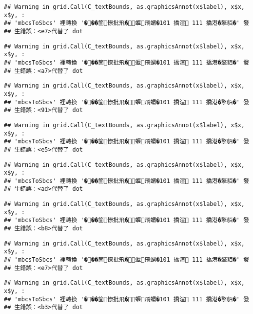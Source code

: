 \documentclass[
]{article}
\begin{document}
\begin{verbatim}
## Warning in grid.Call(C_textBounds, as.graphicsAnnot(x$label), x$x, x$y, :
## 'mbcsToSbcs' 裡轉換 '���箇憭批飛�蝘飛蝟�101 撟渲 111 撟港�摮貊�' 發
## 生錯誤：<e7>代替了 dot
\end{verbatim}

\begin{verbatim}
## Warning in grid.Call(C_textBounds, as.graphicsAnnot(x$label), x$x, x$y, :
## 'mbcsToSbcs' 裡轉換 '���箇憭批飛�蝘飛蝟�101 撟渲 111 撟港�摮貊�' 發
## 生錯誤：<a7>代替了 dot
\end{verbatim}

\begin{verbatim}
## Warning in grid.Call(C_textBounds, as.graphicsAnnot(x$label), x$x, x$y, :
## 'mbcsToSbcs' 裡轉換 '���箇憭批飛�蝘飛蝟�101 撟渲 111 撟港�摮貊�' 發
## 生錯誤：<91>代替了 dot
\end{verbatim}

\begin{verbatim}
## Warning in grid.Call(C_textBounds, as.graphicsAnnot(x$label), x$x, x$y, :
## 'mbcsToSbcs' 裡轉換 '���箇憭批飛�蝘飛蝟�101 撟渲 111 撟港�摮貊�' 發
## 生錯誤：<e5>代替了 dot
\end{verbatim}

\begin{verbatim}
## Warning in grid.Call(C_textBounds, as.graphicsAnnot(x$label), x$x, x$y, :
## 'mbcsToSbcs' 裡轉換 '���箇憭批飛�蝘飛蝟�101 撟渲 111 撟港�摮貊�' 發
## 生錯誤：<ad>代替了 dot
\end{verbatim}

\begin{verbatim}
## Warning in grid.Call(C_textBounds, as.graphicsAnnot(x$label), x$x, x$y, :
## 'mbcsToSbcs' 裡轉換 '���箇憭批飛�蝘飛蝟�101 撟渲 111 撟港�摮貊�' 發
## 生錯誤：<b8>代替了 dot
\end{verbatim}

\begin{verbatim}
## Warning in grid.Call(C_textBounds, as.graphicsAnnot(x$label), x$x, x$y, :
## 'mbcsToSbcs' 裡轉換 '���箇憭批飛�蝘飛蝟�101 撟渲 111 撟港�摮貊�' 發
## 生錯誤：<e7>代替了 dot
\end{verbatim}

\begin{verbatim}
## Warning in grid.Call(C_textBounds, as.graphicsAnnot(x$label), x$x, x$y, :
## 'mbcsToSbcs' 裡轉換 '���箇憭批飛�蝘飛蝟�101 撟渲 111 撟港�摮貊�' 發
## 生錯誤：<b3>代替了 dot
\end{verbatim}
\end{document}

